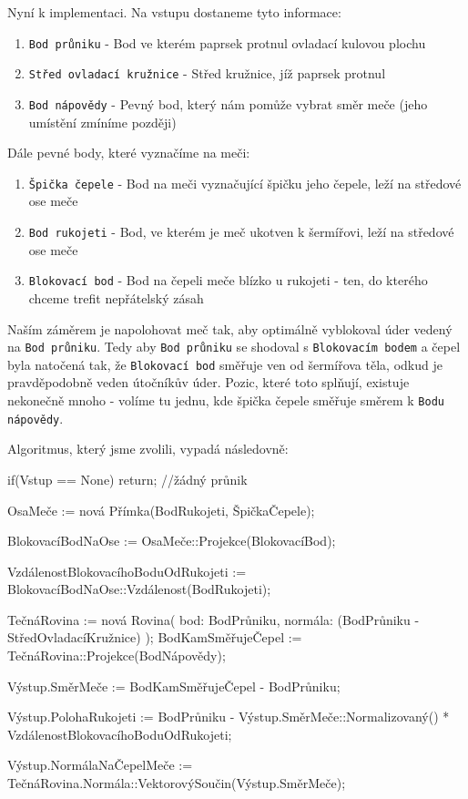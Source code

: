 \pagebreak

Nyní k implementaci. Na vstupu dostaneme tyto informace:
\begin{enumerate}
    \item \texttt{Bod průniku} - Bod ve kterém paprsek protnul ovladací kulovou plochu
    \item \texttt{Střed ovladací kružnice} - Střed kružnice, jíž paprsek protnul
    \item \texttt{Bod nápovědy} - Pevný bod, který nám pomůže vybrat směr meče (jeho umístění zmíníme později)
\end{enumerate}

Dále pevné body, které vyznačíme na meči:
\begin{enumerate}
    \item \texttt{Špička čepele} - Bod na meči vyznačující špičku jeho čepele, leží na středové ose meče
    \item \texttt{Bod rukojeti} - Bod, ve kterém je meč ukotven k šermířovi, leží na středové ose meče
    \item \texttt{Blokovací bod} - Bod na čepeli meče blízko u rukojeti - ten, do kterého chceme trefit nepřátelský zásah 
\end{enumerate}

Naším záměrem je napolohovat meč tak, aby optimálně vyblokoval úder vedený na \texttt{Bod průniku}. Tedy aby \texttt{Bod průniku} se shodoval s \texttt{Blokovacím bodem} a čepel byla natočená tak, že \texttt{Blokovací bod} směřuje ven od šermířova těla, odkud je pravděpodobně veden útočníkův úder. Pozic, které toto splňují, existuje nekonečně mnoho - volíme tu jednu, kde špička čepele směřuje směrem k \texttt{Bodu nápovědy}.

Algoritmus, který jsme zvolili, vypadá následovně:
\begin{code}
 if(Vstup == None) return; //žádný průnik

 OsaMeče := nová Přímka(BodRukojeti, ŠpičkaČepele);

 BlokovacíBodNaOse := OsaMeče::Projekce(BlokovacíBod);

 VzdálenostBlokovacíhoBoduOdRukojeti := 
    BlokovacíBodNaOse::Vzdálenost(BodRukojeti);


 TečnáRovina := nová Rovina(
    bod: BodPrůniku, 
    normála: (BodPrůniku - StředOvladacíKružnice) 
 );
 BodKamSměřujeČepel := TečnáRovina::Projekce(BodNápovědy);


 Výstup.SměrMeče := BodKamSměřujeČepel - BodPrůniku;

 Výstup.PolohaRukojeti :=
   BodPrůniku - Výstup.SměrMeče::Normalizovaný()
   * VzdálenostBlokovacíhoBoduOdRukojeti;
  
 Výstup.NormálaNaČepelMeče := 
   TečnáRovina.Normála::VektorovýSoučin(Výstup.SměrMeče);
\end{code}


